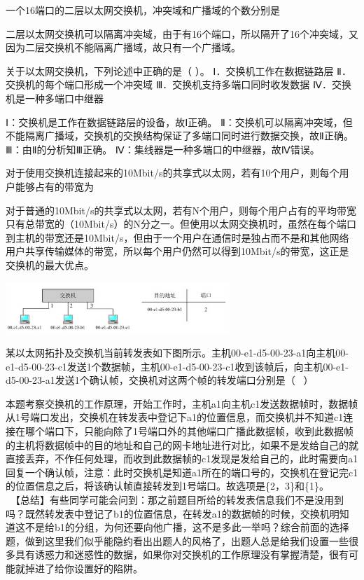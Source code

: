 \question 一个16端口的二层以太网交换机，冲突域和广播域的个数分别是
\par{}
\begin{solution}二层以太网交换机可以隔离冲突域，由于有16个端口，所以隔开了16个冲突域，又因为二层交换机不能隔离广播域，故只有一个广播域。
\end{solution}
\question 关于以太网交换机，下列论述中正确的是（ ）。 Ⅰ．交换机工作在数据链路层
Ⅱ．交换机的每个端口形成一个冲突域 Ⅲ．交换机支持多端口同时收发数据
Ⅳ．交换机是一种多端口中继器
\par{}
\begin{solution}Ⅰ：交换机是工作在数据链路层的设备，故Ⅰ正确。
Ⅱ：交换机可以隔离冲突域，但不能隔离广播域，交换机的交换结构保证了多端口同时进行数据交换，故Ⅱ正确。
Ⅲ：由Ⅱ的分析知Ⅲ正确。 Ⅳ：集线器是一种多端口的中继器，故Ⅳ错误。
\end{solution}
\question 对于使用交换机连接起来的10Mbit/s的共享式以太网，若有10个用户，则每个用户能够占有的带宽为
\par{}
\begin{solution}对于普通的10Mbit/s的共享式以太网，若有N个用户，则每个用户占有的平均带宽只有总带宽的（10Mbit/s）的N分之一。但使用以太网交换机时，虽然在每个端口到主机的带宽还是10Mbit/s，但由于一个用户在通信时是独占而不是和其他网络用户共享传输媒体的带宽，所以每个用户仍然可以得到10Mbit/s的带宽，这正是交换机的最大优点。
\end{solution}
\question \includegraphics[width=3.33333in,height=0.76042in]{computerassets/197693a2bdb2a370018c7838bc839d05.jpeg}~

某以太网拓扑及交换机当前转发表如下图所示。主机00-e1-d5-00-23-a1向主机00-e1-d5-00-23-c1发送1个数据帧，主机00-e1-d5-00-23-c1收到该帧后，向主机00-e1-d5-00-23-a1发送1个确认帧，交换机对这两个帧的转发端口分别是（
~）
\par{}
\begin{solution}本题考察交换机的工作原理，开始工作时，主机a1向主机c1发送数据帧时，数据帧从1号端口发出，交换机在转发表中登记下a1的位置信息，而交换机并不知道c1连接在哪个端口下，只能向除了1号端口外的其他端口广播此数据帧，收到此数据帧的主机将数据帧中的目的地址和自己的网卡地址进行对比，如果不是发给自己的就直接丢弃，不作任何处理，而收到此数据帧的c1发现是发给自己的，此时需要向a1回复一个确认帧，注意：此时交换机是知道a1所在的端口号的，交换机在登记完c1的位置信息之后，将该确认帧直接转发到1号端口。故选项是\{2，3\}和\{1\}。
~ ~
~【总结】有些同学可能会问到：那之前题目所给的转发表信息我们不是没用到吗？既然转发表中登记了b1的位置信息，在转发a1的数据帧的时候，交换机明知道这不是给b1的分组，为何还要向他广播，这不是多此一举吗？综合前面的选择题，做到这里我们似乎能隐约看出出题人的风格了，出题人总是给我们设置一些很多具有诱惑力和迷惑性的数据，如果你对交换机的工作原理没有掌握清楚，很有可能就掉进了给你设置好的陷阱。
\end{solution}

